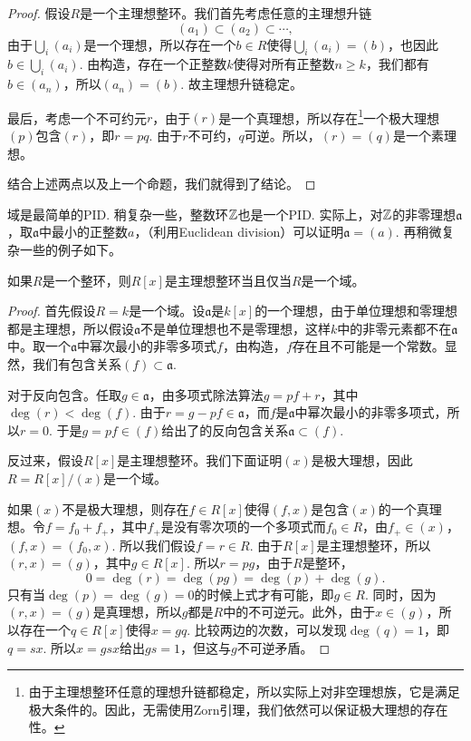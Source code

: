 \begin{proof}
假设$R$是一个主理想整环。我们首先考虑任意的主理想升链
\[
	(a_1)\subset (a_2)\subset \cdots,
\]
由于$\bigcup_i (a_i)$是一个理想，所以存在一个$b\in R$使得$\bigcup_i (a_i)=(b)$，也因此$b\in \bigcup_i (a_i)$. 由构造，存在一个正整数$k$使得对所有正整数$n\geq k$，我们都有$b\in (a_n)$，所以$(a_n)=(b)$. 故主理想升链稳定。

最后，考虑一个不可约元$r$，由于$(r)$是一个真理想，所以存在\footnote{由于主理想整环任意的理想升链都稳定，所以实际上对非空理想族，它是满足极大条件的。因此，无需使用Zorn引理，我们依然可以保证极大理想的存在性。}一个极大理想$(p)$包含$(r)$，即$r=pq$. 由于$r$不可约，$q$可逆。所以，$(r)=(q)$是一个素理想。 

结合上述两点以及上一个命题，我们就得到了结论。
\end{proof}

域是最简单的PID. 稍复杂一些，整数环$\mathbb{Z}$也是一个PID. 实际上，对$\mathbb{Z}$的非零理想$\mathfrak{a}$，取$\mathfrak{a}$中最小的正整数$a$，（利用Euclidean division）可以证明$\mathfrak{a}=(a)$. 再稍微复杂一些的例子如下。

\begin{pro}
如果$R$是一个整环，则$R[x]$是主理想整环当且仅当$R$是一个域。
\end{pro}

\begin{proof}
	首先假设$R=k$是一个域。设$\mathfrak{a}$是$k[x]$的一个理想，由于单位理想和零理想都是主理想，所以假设$\mathfrak{a}$不是单位理想也不是零理想，这样$k$中的非零元素都不在$\mathfrak{a}$中。取一个$\mathfrak{a}$中幂次最小的非零多项式$f$，由构造，$f$存在且不可能是一个常数。显然，我们有包含关系$(f)\subset \mathfrak{a}$.

	对于反向包含。任取$g\in \mathfrak{a}$，由多项式除法算法$g=pf+r$，其中$\deg(r)<\deg(f)$. 由于$r=g-pf\in \mathfrak{a}$，而$f$是$\mathfrak{a}$中幂次最小的非零多项式，所以$r=0$. 于是$g=pf\in (f)$给出了的反向包含关系$\mathfrak{a}\subset (f)$. 

	反过来，假设$R[x]$是主理想整环。我们下面证明$(x)$是极大理想，因此$R=R[x]/(x)$是一个域。

	如果$(x)$不是极大理想，则存在$f\in R[x]$使得$(f,x)$是包含$(x)$的一个真理想。令$f=f_0+f_+$，其中$f_+$是没有零次项的一个多项式而$f_0\in R$，由$f_+\in(x)$，$(f,x)=(f_0,x)$. 所以我们假设$f=r\in R$. 由于$R[x]$是主理想整环，所以$(r,x)=(g)$，其中$g\in R[x]$. 所以$r=pg$，由于$R$是整环，
	\[
		0=\deg(r)=\deg(pg)=\deg(p)+\deg(g). 
	\]
	只有当$\deg(p)=\deg(g)=0$的时候上式才有可能，即$g\in R$. 同时，因为$(r,x)=(g)$是真理想，所以$g$都是$R$中的不可逆元。此外，由于$x\in (g)$，所以存在一个$q\in R[x]$使得$x=gq$. 比较两边的次数，可以发现$\deg(q)=1$，即$q=sx$. 所以$x=gsx$给出$gs=1$，但这与$g$不可逆矛盾。
\end{proof}

